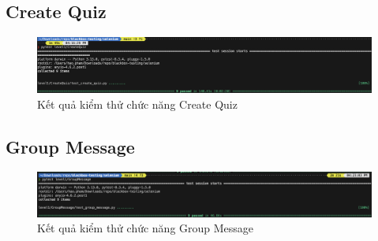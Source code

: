 \subsection{Create Quiz}

\begin{figure}[H]
\centering
\includegraphics[width=\linewidth]{image/results-create-quiz.png}
\caption{Kết quả kiểm thử chức năng Create Quiz}
\end{figure}

\subsection{Group Message}

\begin{figure}[H]
    \centering
    \includegraphics[width=\linewidth]{image/results-group-message.png}
    \caption{Kết quả kiểm thử chức năng Group Message}
\end{figure}